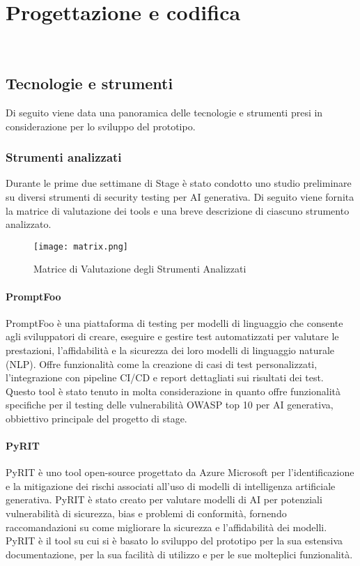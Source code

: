 \chapter{Progettazione e codifica}
\label{cap:progettazione-codifica}

\\

\section{Tecnologie e strumenti}
\label{sec:tecnologie-strumenti}

Di seguito viene data una panoramica delle tecnologie e strumenti presi in considerazione per lo sviluppo del prototipo.

\subsection{Strumenti analizzati}
Durante le prime due settimane di Stage è stato condotto uno studio preliminare su diversi strumenti di security testing per AI generativa. Di seguito viene fornita la matrice di valutazione dei tools e una breve descrizione di ciascuno strumento analizzato.

\begin{figure}[!h]
    \centering
    \texttt{[image: matrix.png]}
    \caption{Matrice di Valutazione degli Strumenti Analizzati}
\end{figure}

\subsubsection*{PromptFoo}
PromptFoo è una piattaforma di testing per modelli di linguaggio che consente agli sviluppatori di creare, eseguire e gestire test automatizzati per valutare le prestazioni, l'affidabilità e la sicurezza dei loro modelli di linguaggio naturale (NLP). Offre funzionalità come la creazione di casi di test personalizzati, l'integrazione con pipeline CI/CD e report dettagliati sui risultati dei test.
Questo tool è stato tenuto in molta considerazione in quanto offre funzionalità specifiche per il testing delle vulnerabilità OWASP top 10 per AI generativa, obbiettivo principale del progetto di stage.

\subsubsection*{PyRIT}
PyRIT è uno tool open-source progettato da Azure Microsoft per l'identificazione e la mitigazione dei rischi associati all'uso di modelli di intelligenza artificiale generativa. PyRIT è stato creato per valutare modelli di AI per potenziali vulnerabilità di sicurezza, bias e problemi di conformità, fornendo raccomandazioni su come migliorare la sicurezza e l'affidabilità dei modelli.\\
PyRIT è il tool su cui si è basato lo sviluppo del prototipo per la sua estensiva documentazione, per la sua facilità di utilizzo e per le sue molteplici funzionalità.

